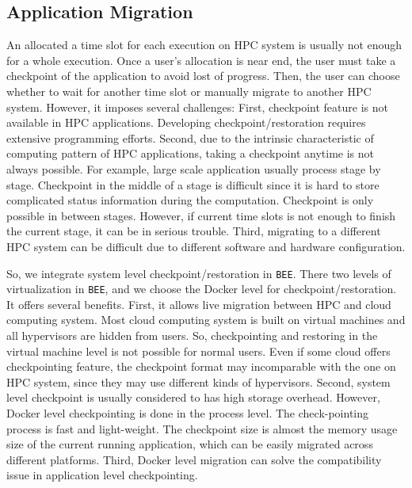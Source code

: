 \subsection{Application Migration}
An allocated a time slot for each execution on HPC system is usually not enough for a whole execution. Once a user's allocation is near end, the user must take a checkpoint of the application to avoid lost of progress. Then, the user can choose whether to wait for another time slot or manually migrate to another HPC system. However, it imposes several challenges: First, checkpoint feature is not available in HPC applications. Developing checkpoint/restoration requires extensive programming efforts. Second, due to the intrinsic characteristic of computing pattern of HPC applications, taking a checkpoint anytime is not always possible. For example, large scale application usually process stage by stage. Checkpoint in the middle of a stage is difficult since it is hard to store complicated status information during the computation. Checkpoint is only possible in between stages. However, if current time slots is not enough to finish the current stage, it can be in serious trouble. Third, migrating to a different HPC system can be difficult due to different software and hardware configuration. 

So, we integrate system level checkpoint/restoration in \texttt{BEE}. There two levels of virtualization in \texttt{BEE}, and we choose the Docker level for checkpoint/restoration. It offers several benefits. First, it allows live migration between HPC and cloud computing system. Most cloud computing system is built on virtual machines and all hypervisors are hidden from users. So, checkpointing and restoring in the virtual machine level is not possible for normal users. Even if some cloud offers checkpointing feature, the checkpoint format may incomparable with the one on HPC system, since they may use different kinds of hypervisors. Second, system level checkpoint is usually considered to has high storage overhead. However, Docker level checkpointing is done in the process level. The check-pointing process is fast and light-weight. The checkpoint size is almost the memory usage size of the current running application, which can be easily migrated across different platforms. Third, Docker level migration can solve the compatibility issue in application level checkpointing.
